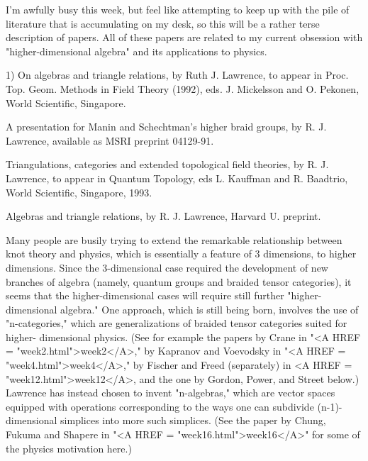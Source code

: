 

I'm awfully busy this week, but feel like attempting to keep up with the
pile of literature that is accumulating on my desk, so this will be a
rather terse description of papers.  All of these papers are related to
my current obsession with "higher-dimensional algebra" and its
applications to physics.  

1) On algebras and triangle relations, by Ruth J. Lawrence, to appear in
Proc. Top. \text{\&}  Geom. Methods in Field Theory (1992), eds. J. Mickelsson and O.
Pekonen, World Scientific, Singapore.

A presentation for Manin and Schechtman's higher braid groups, by R. J.
Lawrence, available as MSRI preprint 04129-91.

Triangulations, categories and extended topological field theories, by R. J.
Lawrence, to appear in Quantum Topology, eds L. Kauffman and R.
Baadtrio, World Scientific, Singapore, 1993.

Algebras and triangle relations, by R. J. Lawrence, Harvard U. preprint.

Many people are busily trying to extend the remarkable relationship
between knot theory and physics, which is essentially a feature of 3
dimensions, to higher dimensions.  Since the 3-dimensional case required
the development of new branches of algebra (namely, quantum groups and
braided tensor categories), it seems that the higher-dimensional cases
will require still further "higher-dimensional algebra."  One approach,
which is still being born, involves the use of "n-categories," which are
generalizations of braided tensor categories suited for higher-
dimensional physics.  (See for example the papers by Crane in "<A HREF = "week2.html">week2</A>,"
by Kapranov and Voevodsky in "<A HREF = "week4.html">week4</A>," by Fischer and Freed (separately)
in <A HREF = "week12.html">week12</A>, and the one by Gordon, Power, and Street below.)  Lawrence
has instead chosen to invent "n-algebras," which are vector spaces
equipped with operations corresponding to the ways one can subdivide
(n-1)-dimensional simplices into more such simplices.  (See the paper by
Chung, Fukuma and Shapere in "<A HREF = "week16.html">week16</A>" for some of the physics motivation
here.)  

